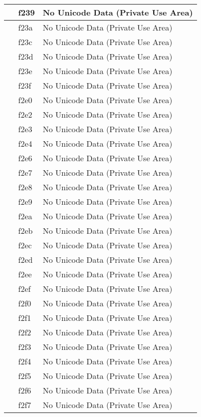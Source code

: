 \documentclass[12pt,letterpaper,openany]{book}
\begin{document}
\begin{center}
\begin{supertabular}{|m{0.25in}|m{0.5in}|m{4in}|}
 & f239 & No Unicode Data (Private Use Area)\\\hline
 & f23a & No Unicode Data (Private Use Area)\\\hline
 & f23c & No Unicode Data (Private Use Area)\\\hline
 & f23d & No Unicode Data (Private Use Area)\\\hline
 & f23e & No Unicode Data (Private Use Area)\\\hline
 & f23f & No Unicode Data (Private Use Area)\\\hline
 & f2e0 & No Unicode Data (Private Use Area)\\\hline
 & f2e2 & No Unicode Data (Private Use Area)\\\hline
 & f2e3 & No Unicode Data (Private Use Area)\\\hline
 & f2e4 & No Unicode Data (Private Use Area)\\\hline
 & f2e6 & No Unicode Data (Private Use Area)\\\hline
 & f2e7 & No Unicode Data (Private Use Area)\\\hline
 & f2e8 & No Unicode Data (Private Use Area)\\\hline
 & f2e9 & No Unicode Data (Private Use Area)\\\hline
 & f2ea & No Unicode Data (Private Use Area)\\\hline
 & f2eb & No Unicode Data (Private Use Area)\\\hline
 & f2ec & No Unicode Data (Private Use Area)\\\hline
 & f2ed & No Unicode Data (Private Use Area)\\\hline
 & f2ee & No Unicode Data (Private Use Area)\\\hline
 & f2ef & No Unicode Data (Private Use Area)\\\hline
 & f2f0 & No Unicode Data (Private Use Area)\\\hline
 & f2f1 & No Unicode Data (Private Use Area)\\\hline
 & f2f2 & No Unicode Data (Private Use Area)\\\hline
 & f2f3 & No Unicode Data (Private Use Area)\\\hline
 & f2f4 & No Unicode Data (Private Use Area)\\\hline
 & f2f5 & No Unicode Data (Private Use Area)\\\hline
 & f2f6 & No Unicode Data (Private Use Area)\\\hline
 & f2f7 & No Unicode Data (Private Use Area)\\\hline

\end{supertabular}
\end{center}
\end{document}
